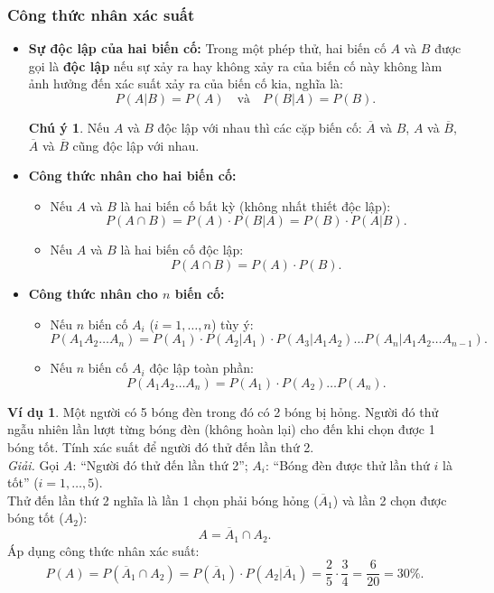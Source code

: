 \documentclass[12pt,a4paper]{article}
\theoremstyle{definition}
\newtheorem{vidu}{Ví dụ}[section]
\newtheorem{chuy}{Chú ý}[section]
\begin{document}
\subsubsection{Công thức nhân xác suất}
\begin{itemize}[leftmargin=1.5em]
    \item \textbf{Sự độc lập của hai biến cố:}
    Trong một phép thử, hai biến cố $A$ và $B$ được gọi là \textbf{độc lập} nếu sự xảy ra hay không xảy ra của biến cố này không làm ảnh hưởng đến xác suất xảy ra của biến cố kia, nghĩa là:
    \[
    P(A|B) = P(A) \quad \text{và} \quad P(B|A) = P(B).
    \]
    \begin{chuy}
    Nếu $A$ và $B$ độc lập với nhau thì các cặp biến cố: $\overline{A}$ và $B$, $A$ và $\overline{B}$, $\overline{A}$ và $\overline{B}$ cũng độc lập với nhau.
    \end{chuy}

    \item \textbf{Công thức nhân cho hai biến cố:}
    \begin{itemize}
        \item Nếu $A$ và $B$ là hai biến cố bất kỳ (không nhất thiết độc lập):
        \[
        P(A \cap B) = P(A) \cdot P(B|A) = P(B) \cdot P(A|B).
        \]
        \item Nếu $A$ và $B$ là hai biến cố độc lập:
        \[
        P(A \cap B) = P(A) \cdot P(B).
        \]
    \end{itemize}

    \item \textbf{Công thức nhân cho $n$ biến cố:}
    \begin{itemize}
        \item Nếu $n$ biến cố $A_i$ ($i = 1, \dots, n$) tùy ý:
        \[
        P(A_1 A_2 \dots A_n) = P(A_1) \cdot P(A_2 | A_1) \cdot P(A_3 | A_1 A_2) \dots P(A_n | A_1 A_2 \dots A_{n-1}).
        \]
        \item Nếu $n$ biến cố $A_i$ độc lập toàn phần:
        \[
        P(A_1 A_2 \dots A_n) = P(A_1) \cdot P(A_2) \dots P(A_n).
        \]
    \end{itemize}
\end{itemize}

\begin{vidu}
Một người có 5 bóng đèn trong đó có 2 bóng bị hỏng. Người đó thử ngẫu nhiên lần lượt từng bóng đèn (không hoàn lại) cho đến khi chọn được 1 bóng tốt. Tính xác suất để người đó thử đến lần thứ 2.\\
\textit{Giải.} 
Gọi $A$: ``Người đó thử đến lần thứ 2''; $A_i$: ``Bóng đèn được thử lần thứ $i$ là tốt'' ($i = 1, \dots, 5$).\\
Thử đến lần thứ 2 nghĩa là lần 1 chọn phải bóng hỏng ($\overline{A}_1$) và lần 2 chọn được bóng tốt ($A_2$):
\[
A = \overline{A}_1 \cap A_2.
\]
Áp dụng công thức nhân xác suất:
\[
P(A) = P(\overline{A}_1 \cap A_2) = P(\overline{A}_1) \cdot P(A_2 | \overline{A}_1) = \frac{2}{5} \cdot \frac{3}{4} = \frac{6}{20} = 30\%.
\]
\end{vidu}
\end{document}
